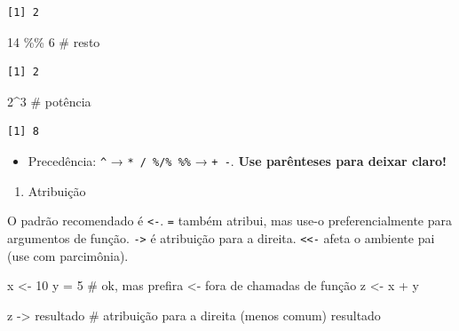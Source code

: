 \documentclass[
  letterpaper,
  DIV=11,
  numbers=noendperiod]{scrreprt}
\newenvironment{Shaded}{\begin{snugshade}}{\end{snugshade}}
\newcommand{\CommentTok}[1]{\textcolor[rgb]{0.37,0.37,0.37}{#1}}
\newcommand{\DecValTok}[1]{\textcolor[rgb]{0.68,0.00,0.00}{#1}}
\newcommand{\NormalTok}[1]{\textcolor[rgb]{0.00,0.23,0.31}{#1}}
\newcommand{\OtherTok}[1]{\textcolor[rgb]{0.00,0.23,0.31}{#1}}
\newcommand{\SpecialCharTok}[1]{\textcolor[rgb]{0.37,0.37,0.37}{#1}}
\providecommand{\tightlist}{%
  \setlength{\itemsep}{0pt}\setlength{\parskip}{0pt}}\usepackage{longtable,booktabs,array}
\begin{document}
\begin{verbatim}
[1] 2
\end{verbatim}

\begin{Shaded}
\begin{Highlighting}[]
\DecValTok{14} \SpecialCharTok{\%\%} \DecValTok{6} \CommentTok{\# resto}
\end{Highlighting}
\end{Shaded}

\begin{verbatim}
[1] 2
\end{verbatim}

\begin{Shaded}
\begin{Highlighting}[]
\DecValTok{2}\SpecialCharTok{\^{}}\DecValTok{3}  \CommentTok{\# potência}
\end{Highlighting}
\end{Shaded}

\begin{verbatim}
[1] 8
\end{verbatim}

\begin{itemize}
\tightlist
\item
  Precedência: \texttt{\^{}} → \texttt{*\ /\ \%/\%\ \%\%} →
  \texttt{+\ -}. \textbf{Use parênteses para deixar claro!}
\end{itemize}

\begin{enumerate}
\def\labelenumi{\arabic{enumi})}
\setcounter{enumi}{2}
\tightlist
\item
  Atribuição
\end{enumerate}

O padrão recomendado é \texttt{\textless{}-}. \texttt{=} também atribui,
mas use-o preferencialmente para argumentos de função.
\texttt{-\textgreater{}} é atribuição para a direita.
\texttt{\textless{}\textless{}-} afeta o ambiente pai (use com
parcimônia).

\begin{Shaded}
\begin{Highlighting}[]
\NormalTok{x }\OtherTok{\textless{}{-}} \DecValTok{10}
\NormalTok{y }\OtherTok{=} \DecValTok{5}   \CommentTok{\# ok, mas prefira \textless{}{-} fora de chamadas de função}
\NormalTok{z }\OtherTok{\textless{}{-}}\NormalTok{ x }\SpecialCharTok{+}\NormalTok{ y}

\NormalTok{z }\OtherTok{{-}\textgreater{}}\NormalTok{ resultado  }\CommentTok{\# atribuição para a direita (menos comum)}
\NormalTok{resultado}
\end{Highlighting}
\end{Shaded}
\end{document}
